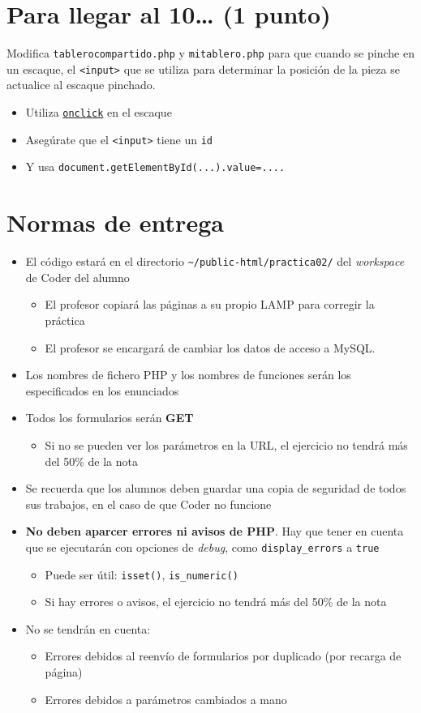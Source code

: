 \documentclass[a4paper]{article}
\begin{document}
\section{Para llegar al 10\ldots{} (1 punto)}
\label{sec:org000000c}
Modifica \texttt{tablerocompartido.php} y \texttt{mitablero.php} para que cuando se pinche en un escaque, el \texttt{<input>} que se utiliza para determinar la posición de la pieza se actualice al escaque pinchado.
\begin{itemize}
\item Utiliza \href{https://www.geeksforgeeks.org/javascript/javascript-onclick-event/}{\texttt{onclick}} en el escaque
\item Asegúrate que el \texttt{<input>} tiene un \texttt{id}
\item Y usa \texttt{document.getElementById(...).value=....}
\end{itemize}
\section*{Normas de entrega}
\label{sec:org000000f}
\begin{itemize}
\item El código estará en el directorio \texttt{\textasciitilde{}/public-html/practica02/} del \emph{workspace} de Coder del alumno
\begin{itemize}
\item El profesor copiará las páginas a su propio LAMP para corregir la práctica
\item El profesor se encargará de cambiar los datos de acceso a MySQL.
\end{itemize}
\item Los nombres de fichero PHP y los nombres de funciones serán los especificados en los enunciados
\item Todos los formularios serán \textbf{GET}
\begin{itemize}
\item Si no se pueden ver los parámetros en la URL, el ejercicio no tendrá más del 50\% de la nota
\end{itemize}
\item Se recuerda que los alumnos deben guardar una copia de seguridad de todos sus trabajos, en el caso de que Coder no funcione
\item \textbf{No deben aparcer errores ni avisos de PHP}. Hay que tener en cuenta que se ejecutarán con opciones de \emph{debug}, como \texttt{display\_errors} a \texttt{true}
\begin{itemize}
\item Puede ser útil: \texttt{isset()}, \texttt{is\_numeric()}
\item Si hay errores o avisos, el ejercicio no tendrá más del 50\% de la nota
\end{itemize}
\item No se tendrán en cuenta:
\begin{itemize}
\item Errores debidos al reenvío de formularios por duplicado (por recarga de página)
\item Errores debidos a parámetros cambiados a mano
\end{itemize}
\end{itemize}
\end{document}
